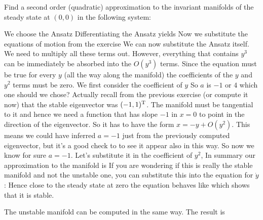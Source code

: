 Find a second order (quadratic) approximation to the invariant manifolds of the steady state at $(0,0)$ in the following system:


\solution 
We choose the Ansatz
Differentiating the Ansatz yields 
Now we substitute the equations of motion from the exercise 
We can now substitute the Ansatz itself. 
We need to multiply all these terms out. However, everything that contains $y^3$ can be immediately be absorbed into the $O(y^3)$ terms. 
Since the equation must be true for every $y$ (all the way along the manifold) the coefficients of the $y$ and $y^2$ terms must be zero. We first consider the coefficient of $y$ 
So $a$ is $-1$ or $4$ which one should we chose? Actually recall from the previous exercise (or compute it now) that the stable eigenvector was $(-1,1)^{\rm T}$. The manifold must be tangential to it and hence we need a function that has slope $-1$ in $x=0$ to point in the direction of the eigenvector. So it has to have the form $x=-y+O(y^2)$. This means we could have inferred $a=-1$ just from the previously computed eigenvector, but it's a good check to to see it appear also in this way. So now we know for sure $a=-1$. Let's substitute it in the coefficient of $y^2$, 
In summary our approximation to the manifold is
If you are wondering if this is really the stable manifold and not the unstable one, you can substitute this into the equation for $\dot{y}$:
Hence close to the steady state at zero the equation behaves like 
which shows that it is stable. 

The unstable manifold can be computed in the same way. The result is 
